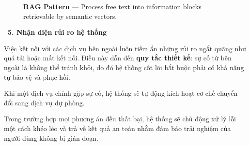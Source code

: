 \documentclass[12pt, a4paper]{article}
\begin{document}
\begin{figure}[H]
    \centering
    \caption{\textbf{RAG Pattern} --- Process free text into information blocks retrievable by semantic vectors.}
\end{figure}

\vspace{0.4cm}
\noindent\textcolor{red!80!black}{\textbf{\faExclamationTriangle \ 5. Nhận diện rủi ro hệ thống}}
\vspace{0.15cm}

\begin{tcolorbox}[blanker, borderline west={3pt}{0pt}{red!60!black}, left=12pt, top=2pt, bottom=2pt]
Việc kết nối với các dịch vụ bên ngoài luôn tiềm ẩn những rủi ro ngắt quãng như quá tải hoặc mất kết nối. Điều này dẫn đến \textbf{quy tắc thiết kế}: sự cố từ bên ngoài là không thể tránh khỏi, do đó hệ thống cốt lõi bắt buộc phải có khả năng tự bảo vệ và phục hồi.

\vspace{0.15cm}
\noindent Khi một dịch vụ chính gặp sự cố, hệ thống sẽ tự động kích hoạt cơ chế chuyển đổi sang dịch vụ dự phòng.

\vspace{0.15cm}
\noindent Trong trường hợp mọi phương án đều thất bại, hệ thống sẽ chủ động xử lý lỗi một cách khéo léo và trả về kết quả an toàn nhằm đảm bảo trải nghiệm của người dùng không bị gián đoạn.
\end{tcolorbox}
\end{document}
